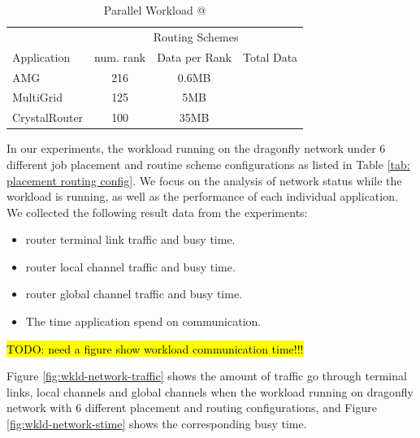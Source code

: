 \documentclass[conference,compsoc]{IEEEtran}
\makeatletter
\newcommand{\TODO}[1]{\hl{TODO: #1}}
\newcommand{\Rmnum}[1]{\expandafter\@slowromancap\romannumeral #1@}
\makeatother
\begin{document}
\begin{table}[ht]
\begin{center}
\caption{Parallel Workload \Rmnum{1 }} 
\label{tab: parallel workload-1}
\begin{tabular}{l c c c }
\toprule %
\toprule
&\multicolumn{3}{c}{Routing Schemes} \\ %
\cmidrule(l){2-4}
Application & num. rank & Data per Rank & Total Data\\ %
\midrule %
AMG  &    216 &   0.6MB   &     \\ %
\midrule
MultiGrid  &    125 &   5MB   &     \\ 
\midrule
CrystalRouter  &   100  &  35MB    &     \\ 

\midrule %
\bottomrule %
\end{tabular}
\end{center}
\end{table}

In our experiments, the workload running on the dragonfly network under 6 different job placement and routine scheme configurations as listed in Table \ref{tab: placement routing config}. We focus on the analysis of network status while the workload is running, as well as the performance of each individual application. We collected the following result data from the experiments:
\begin{itemize}
    \item router terminal link traffic and busy time.
    \item router local channel traffic and busy time.
    \item router global channel traffic and busy time.
    \item The time application spend on communication. 
\end{itemize}


\TODO{need a figure show workload communication time!!!}

Figure \ref{fig:wkld-network-traffic} shows the amount of traffic go through terminal links, local channels and global channels when the workload running on dragonfly network with 6 different placement and routing configurations, and Figure \ref{fig:wkld-network-stime} shows the corresponding busy time. 
\end{document}

